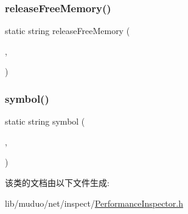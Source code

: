\mbox{\label{classmuduo_1_1net_1_1PerformanceInspector_a76ebee8151ab3a7d0006c95caa4407d3}} 
\subsubsection{\texorpdfstring{release\+Free\+Memory()}{releaseFreeMemory()}}
{\footnotesize\ttfamily static string release\+Free\+Memory (\begin{DoxyParamCaption}\item[{\hyperlink{classmuduo_1_1net_1_1HttpRequest_a2a3c0067e44c5ef3210a256d06c16b0f}{Http\+Request\+::\+Method}}]{,  }\item[{const \hyperlink{classmuduo_1_1net_1_1Inspector_aa22799cd3b4f56688d431d68c2d014a0}{Inspector\+::\+Arg\+List} \&}]{ }\end{DoxyParamCaption})\hspace{0.3cm}{\ttfamily [static]}}

\mbox{\label{classmuduo_1_1net_1_1PerformanceInspector_ab52d0c847bce43680fbb4845e8f78a19}} 
\subsubsection{\texorpdfstring{symbol()}{symbol()}}
{\footnotesize\ttfamily static string symbol (\begin{DoxyParamCaption}\item[{\hyperlink{classmuduo_1_1net_1_1HttpRequest_a2a3c0067e44c5ef3210a256d06c16b0f}{Http\+Request\+::\+Method}}]{,  }\item[{const \hyperlink{classmuduo_1_1net_1_1Inspector_aa22799cd3b4f56688d431d68c2d014a0}{Inspector\+::\+Arg\+List} \&}]{ }\end{DoxyParamCaption})\hspace{0.3cm}{\ttfamily [static]}}



该类的文档由以下文件生成\+:\begin{DoxyCompactItemize}
\item 
lib/muduo/net/inspect/\hyperlink{PerformanceInspector_8h}{Performance\+Inspector.\+h}\end{DoxyCompactItemize}

